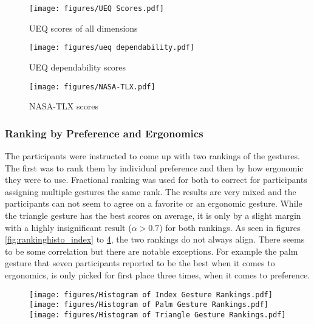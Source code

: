 \begin{figure}[!ht]
    \centering
    \texttt{[image: figures/UEQ Scores.pdf]}
    \caption{UEQ scores of all dimensions}
    \label{fig:ueqDimensions}
\end{figure}

\begin{figure}[!ht]
    \centering
    \texttt{[image: figures/ueq dependability.pdf]}
    \caption{UEQ dependability scores}
    \label{fig:ueqDependability}
\end{figure}

\begin{figure}[!ht]
    \centering
    \texttt{[image: figures/NASA-TLX.pdf]}
    \caption{NASA-TLX scores}
    \label{fig:tlx}
\end{figure}

\subsubsection{Ranking by Preference and Ergonomics}
The participants were instructed to come up with two rankings of the gestures. The first was to rank them by individual preference and then by how ergonomic they were to use. Fractional ranking was used for both to correct for participants assigning multiple gestures the same rank. The results are very mixed and the participants can not seem to agree on a favorite or an ergonomic gesture. While the triangle gesture has the best scores on average, it is only by a slight margin with a highly insignificant result ($\alpha > 0.7$) for both rankings. As seen in figures \ref{fig:rankinghisto_index} to \ref{fig:rankinghisto_triangle}, the two rankings do not always align. There seems to be some correlation but there are notable exceptions. For example the palm gesture that seven participants reported to be the best when it comes to ergonomics, is only picked for first place three times, when it comes to preference. 

\begin{figure}[!htb]
        \texttt{[image: figures/Histogram of Index Gesture Rankings.pdf]}
        \label{fig:rankinghisto_index}
    \endminipage\hfill
        \texttt{[image: figures/Histogram of Palm Gesture Rankings.pdf]}
        \label{fig:rankinghisto_palm}
    \endminipage\hfill
        \texttt{[image: figures/Histogram of Triangle Gesture Rankings.pdf]}
        \label{fig:rankinghisto_triangle}
    \endminipage
\end{figure}
    

